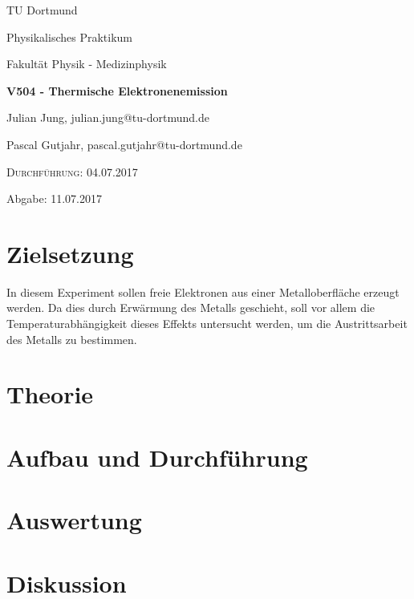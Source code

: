 


\begin{titlepage}
  \centering
  {\LARGE TU Dortmund \par}
  \vspace{0.75cm}
  {\Large Physikalisches Praktikum \par}
  \vspace{0.75cm}
  {\Large Fakultät Physik - Medizinphysik \par}
  \vspace{4cm}
  {\LARGE \bfseries V504 - Thermische Elektronenemission \par}
  \vspace{4cm}
  {\large Julian Jung, julian.jung@tu-dortmund.de \par \vspace{0.25cm}
  Pascal Gutjahr, pascal.gutjahr@tu-dortmund.de \par}
  \vspace{6cm}
  {\scshape Durchführung: 04.07.2017 \par \vspace{0.25cm}
  Abgabe: 11.07.2017}
\end{titlepage}
\newpage
\tableofcontents
\newpage
\section{Zielsetzung}
In diesem Experiment sollen freie Elektronen aus einer Metalloberfläche erzeugt werden.
Da dies durch Erwärmung des Metalls geschieht, soll vor allem die Temperaturabhängigkeit
dieses Effekts untersucht werden, um die Austrittsarbeit des Metalls zu bestimmen.
\section{Theorie}

\section{Aufbau und Durchführung}

\section{Auswertung}

\section{Diskussion}

\printbibliography

